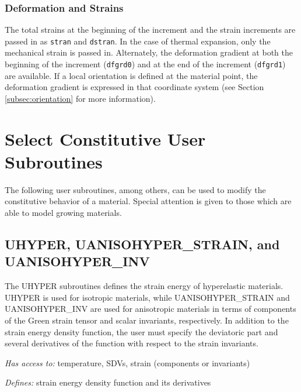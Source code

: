\documentclass[10pt,letterpaper,oneside]{report}
\begin{document}
\subsubsection{Deformation and Strains}  
The total strains at the beginning of the increment and the strain increments are passed in as \texttt{stran} and \texttt{dstran}.  In the case of thermal expansion, only the mechanical strain is passed in.  Alternately, the deformation gradient at both the beginning of the increment (\texttt{dfgrd0}) and at the end of the increment (\texttt{dfgrd1}) are available.  If a local orientation is defined at the material point, the deformation gradient is expressed in that coordinate system (see Section \ref{subsec:orientation} for more information).  

\section{Select Constitutive User Subroutines}
The following user subroutines, among others, can be used to modify the constitutive behavior of a material.  Special attention is given to those which are able to model growing materials.

\subsection{UHYPER, UANISOHYPER\_STRAIN, and UANISOHYPER\_INV}
The UHYPER subroutines defines the strain energy of hyperelastic materials.  UHYPER is used for isotropic materials, while UANISOHYPER\_STRAIN and UANISOHYPER\_INV are used for anisotropic materials in terms of components of the Green strain tensor and scalar invariants, respectively.  In addition to the strain energy density function, the user must specify the deviatoric part and several derivatives of the function with respect to the strain invariants. 

\emph{Has access to:} temperature, SDVs, strain (components or invariants)

\emph{Defines:} strain energy density function and its derivatives


\end{document}
